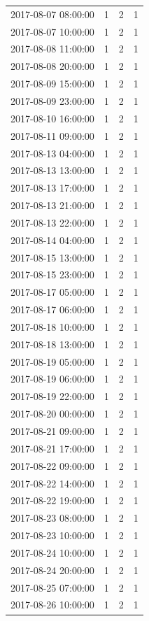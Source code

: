 \begin{tabular}{lrrr}
2017-08-07 08:00:00 & 1 & 2 & 1 \\
2017-08-07 10:00:00 & 1 & 2 & 1 \\
2017-08-08 11:00:00 & 1 & 2 & 1 \\
2017-08-08 20:00:00 & 1 & 2 & 1 \\
2017-08-09 15:00:00 & 1 & 2 & 1 \\
2017-08-09 23:00:00 & 1 & 2 & 1 \\
2017-08-10 16:00:00 & 1 & 2 & 1 \\
2017-08-11 09:00:00 & 1 & 2 & 1 \\
2017-08-13 04:00:00 & 1 & 2 & 1 \\
2017-08-13 13:00:00 & 1 & 2 & 1 \\
2017-08-13 17:00:00 & 1 & 2 & 1 \\
2017-08-13 21:00:00 & 1 & 2 & 1 \\
2017-08-13 22:00:00 & 1 & 2 & 1 \\
2017-08-14 04:00:00 & 1 & 2 & 1 \\
2017-08-15 13:00:00 & 1 & 2 & 1 \\
2017-08-15 23:00:00 & 1 & 2 & 1 \\
2017-08-17 05:00:00 & 1 & 2 & 1 \\
2017-08-17 06:00:00 & 1 & 2 & 1 \\
2017-08-18 10:00:00 & 1 & 2 & 1 \\
2017-08-18 13:00:00 & 1 & 2 & 1 \\
2017-08-19 05:00:00 & 1 & 2 & 1 \\
2017-08-19 06:00:00 & 1 & 2 & 1 \\
2017-08-19 22:00:00 & 1 & 2 & 1 \\
2017-08-20 00:00:00 & 1 & 2 & 1 \\
2017-08-21 09:00:00 & 1 & 2 & 1 \\
2017-08-21 17:00:00 & 1 & 2 & 1 \\
2017-08-22 09:00:00 & 1 & 2 & 1 \\
2017-08-22 14:00:00 & 1 & 2 & 1 \\
2017-08-22 19:00:00 & 1 & 2 & 1 \\
2017-08-23 08:00:00 & 1 & 2 & 1 \\
2017-08-23 10:00:00 & 1 & 2 & 1 \\
2017-08-24 10:00:00 & 1 & 2 & 1 \\
2017-08-24 20:00:00 & 1 & 2 & 1 \\
2017-08-25 07:00:00 & 1 & 2 & 1 \\
2017-08-26 10:00:00 & 1 & 2 & 1 \\

\end{tabular}
